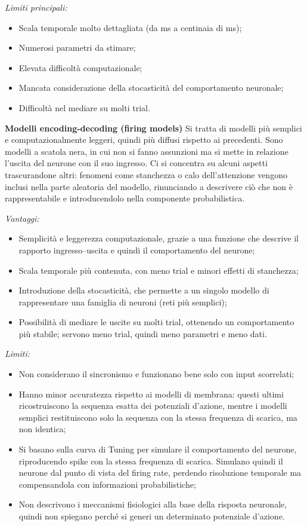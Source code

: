 \documentclass[12pt,a4paper,openany]{book}
\begin{document}
\textit{Limiti principali:}
\begin{itemize}
  \item Scala temporale molto dettagliata (da ms a centinaia di ms);
  \item Numerosi parametri da stimare;
  \item Elevata difficoltà computazionale;
  \item Mancata considerazione della stocasticità del comportamento neuronale;
  \item Difficoltà nel mediare su molti trial.
\end{itemize}

\textbf{Modelli encoding-decoding (firing models)}
Si tratta di modelli più semplici e computazionalmente leggeri, quindi più diffusi rispetto ai precedenti. Sono modelli a scatola nera, in cui non si fanno assunzioni ma si mette in relazione l'uscita del neurone con il suo ingresso. Ci si concentra su alcuni aspetti trascurandone altri: fenomeni come stanchezza o calo dell'attenzione vengono inclusi nella parte aleatoria del modello, rinunciando a descrivere ciò che non è rappresentabile e introducendolo nella componente probabilistica.

\textit{Vantaggi:}
\begin{itemize}
  \item Semplicità e leggerezza computazionale, grazie a una funzione che descrive il rapporto ingresso--uscita e quindi il comportamento del neurone;
  \item Scala temporale più contenuta, con meno trial e minori effetti di stanchezza;
  \item Introduzione della stocasticità, che permette a un singolo modello di rappresentare una famiglia di neuroni (reti più semplici);
  \item Possibilità di mediare le uscite su molti trial, ottenendo un comportamento più stabile; servono meno trial, quindi meno parametri e meno dati.
\end{itemize}

\textit{Limiti:}
\begin{itemize}
  \item Non considerano il sincronismo e funzionano bene solo con input scorrelati;
  \item Hanno minor accuratezza rispetto ai modelli di membrana: questi ultimi ricostruiscono la sequenza esatta dei potenziali d'azione, mentre i modelli semplici restituiscono solo la sequenza con la stessa frequenza di scarica, ma non identica;
  \item Si basano sulla curva di Tuning per simulare il comportamento del neurone, riproducendo spike con la stessa frequenza di scarica. Simulano quindi il neurone dal punto di vista del firing rate, perdendo risoluzione temporale ma compensandola con informazioni probabilistiche;
  \item Non descrivono i meccanismi fisiologici alla base della risposta neuronale, quindi non spiegano perché si generi un determinato potenziale d'azione.
\end{itemize}
\end{document}
